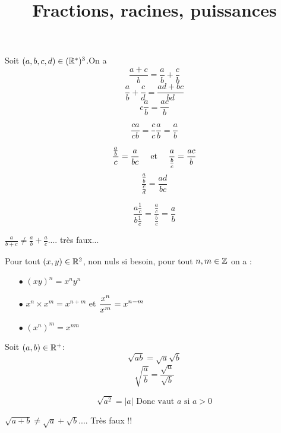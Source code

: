 \documentclass[a4paper, 11pt]{article}
\begin{document}
\title{Fractions, racines, puissances}




\begin{prop}
Soit $(a,b,c,d)\in (\mathbb{R}^*)^3$.On a
$$\frac{a+c}{b}=\frac{a}{b}+ \frac{c}{b}
$$
$$\frac{a}{b}+\frac{c}{d}=\frac{ad+bc}{bd}$$
$$c\frac{a}{b}=\frac{ac}{b}  $$

$$\frac{ca}{cb}=\frac{c}{c}\frac{a}{b}  =\frac{a}{b}$$

$$\frac{\frac{a}{b}}{c} = \frac{a}{bc} \quad \text{ et } \quad \frac{a}{\frac{b}{c}} = \frac{ac}{b}$$
 $$\frac{\frac{a}{b}}{\frac{c}{d}} = \frac{ad}{bc}$$

 $$\frac{a\frac{1}{c}}{b\frac{1}{c}} =\frac{\frac{a}{c}}{\frac{b}{c}} =\frac{a}{b}$$
 
\end{prop}

\warning $\frac{a}{b+c }\neq \frac{a}{b}+\frac{a}{c}$....  très faux...

\begin{prop} \label{prop-regle de calcul puissance}
Pour tout $(x,y) \in \mathbb{R}^2$, non nuls si besoin, pour tout $n,m\in \mathbb{Z}$ on a :
\begin{itemize}
\item[$\bullet$] $(xy)^n =x^n y^n$
\item[$\bullet$] $x^{n} \times x^m = x^{n+m}$ \; et \; $\displaystyle \frac{x^n}{x^m} =x^{n-m}$
\item[$\bullet$] $ (x^n)^m = x^{nm}$
\end{itemize}
\end{prop}


\begin{prop}
Soit $(a,b)\in \mathbb{R}^+$:
$$\sqrt{ab} =\sqrt{a}\sqrt{b}$$
$$\sqrt{\frac{a}{b}} =\frac{\sqrt{a}}{\sqrt{b}}$$


$$\sqrt{a^2} =|a| \text{ Donc vaut $a$ si $a>0$} $$


\end{prop}

\warning $\sqrt{a+b} \ne \sqrt{a}+\sqrt{b} $....  Très faux !!
\end{document}
